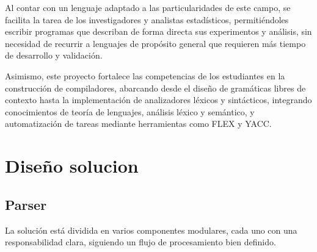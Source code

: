 \documentclass{article}
\begin{document}
Al contar con un lenguaje adaptado a las particularidades de este campo, se facilita la tarea de los investigadores y analistas estadísticos, permitiéndoles escribir programas que describan de forma directa sus experimentos y análisis, sin necesidad de recurrir a lenguajes de propósito general que requieren más tiempo de desarrollo y validación.

Asimismo, este proyecto fortalece las competencias de los estudiantes en la construcción de compiladores, abarcando desde el diseño de gramáticas libres de contexto hasta la implementación de analizadores léxicos y sintácticos, integrando conocimientos de teoría de lenguajes, análisis léxico y semántico, y automatización de tareas mediante herramientas como FLEX y YACC.

\section{Diseño solucion}
\subsection{Parser}

La solución está dividida en varios componentes modulares, cada uno con una responsabilidad clara, siguiendo un flujo de procesamiento bien definido.
\end{document}
